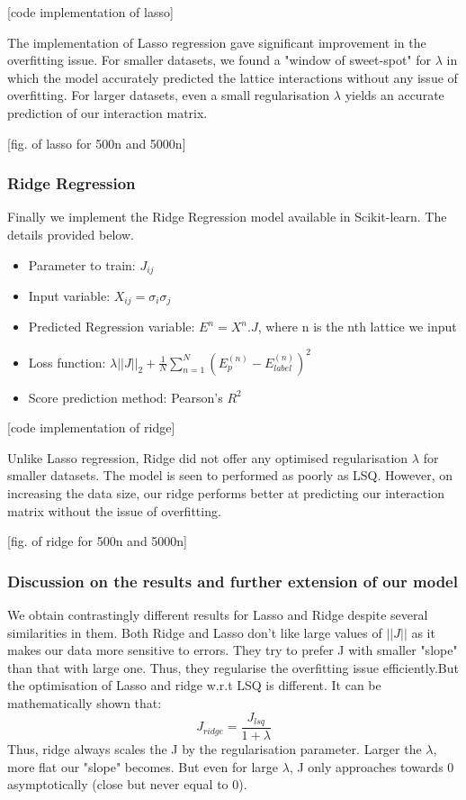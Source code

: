 [code implementation of lasso]

The implementation of Lasso regression gave significant improvement in the overfitting issue. For smaller datasets, we found a "window of sweet-spot" for \(\lambda\) in which the model accurately predicted the lattice interactions without any issue of overfitting. For larger datasets, even a small regularisation \(\lambda\) yields an accurate prediction of our interaction matrix.

[fig. of lasso for 500n and 5000n]

\subsubsection{Ridge Regression}
Finally we implement the Ridge Regression model available in Scikit-learn. The details provided below.
\begin{itemize}
    \item Parameter to train: \(J_{ij}\)
    \item Input variable: \(X_{ij}=\sigma_i\sigma_j\)
    \item Predicted Regression variable: \(E^n=X^n.J\), where n is the nth lattice we input
    \item Loss function: \(\lambda ||J||_2 + \frac{1}{N} \sum_{n=1}^N(E_p^{(n)}-E_{label}^{(n)})^2\)
    \item Score prediction method: Pearson's \(R^2\)
\end{itemize}

[code implementation of ridge]

Unlike Lasso regression, Ridge did not offer any optimised regularisation \(\lambda\) for smaller datasets. The model is seen to performed as poorly as LSQ. However, on increasing the data size, our ridge performs better at predicting our interaction matrix without the issue of overfitting.

[fig. of ridge for 500n and 5000n]

\subsubsection{Discussion on the results and further extension of our model}
We obtain contrastingly different results for Lasso and Ridge despite several similarities in them. Both Ridge and Lasso don't like large values of \(||J||\) as it makes our data more sensitive to errors. They try to prefer J with smaller "slope" than that with large one. Thus, they regularise the overfitting issue efficiently.But the optimisation of Lasso and ridge w.r.t LSQ is different. It can be mathematically shown that:
\[J_{ridge}=\frac{J_{lsq}}{1+\lambda}\]
Thus, ridge always scales the J by the regularisation parameter. Larger the \(\lambda\), more flat our "slope" becomes. But even for large \(\lambda\), J only approaches towards 0 asymptotically (close but never equal to 0).

